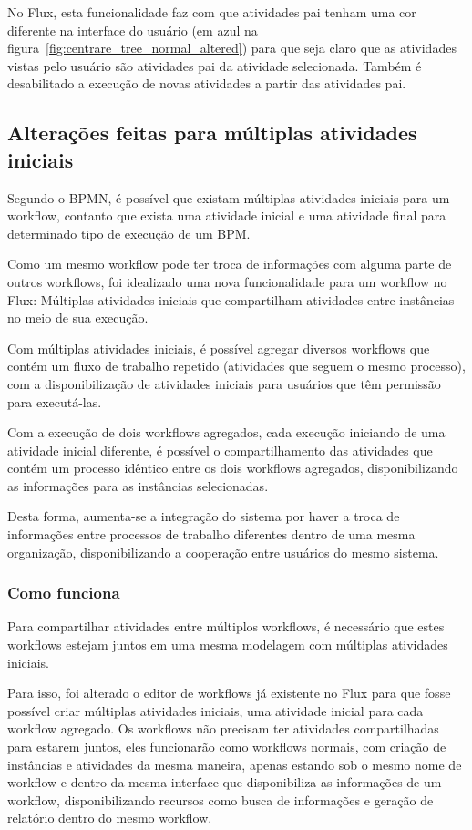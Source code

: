 No Flux, esta funcionalidade faz com que atividades pai tenham uma cor diferente na interface do usuário (em azul na figura~\ref{fig:centrare_tree_normal_altered}) para que seja claro que as atividades vistas pelo usuário são atividades pai da atividade selecionada. Também é desabilitado a execução de novas atividades a partir das atividades pai.

\subsection{Alterações feitas para múltiplas atividades iniciais}

Segundo o BPMN, é possível que existam múltiplas atividades iniciais para um workflow, contanto que exista uma atividade inicial e uma atividade final para determinado tipo de execução de um BPM.

Como um mesmo workflow pode ter troca de informações com alguma parte de outros workflows, foi idealizado uma nova funcionalidade para um workflow no Flux: Múltiplas atividades iniciais que compartilham atividades entre instâncias no meio de sua execução.

Com múltiplas atividades iniciais, é possível agregar diversos workflows que contém um fluxo de trabalho repetido (atividades que seguem o mesmo processo), com a disponibilização de atividades iniciais para usuários que têm permissão para executá-las.

Com a execução de dois workflows agregados, cada execução iniciando de uma atividade inicial diferente, é possível o compartilhamento das atividades que contém um processo idêntico entre os dois workflows agregados, disponibilizando as informações para as instâncias selecionadas.

Desta forma, aumenta-se a integração do sistema por haver a troca de informações entre processos de trabalho diferentes dentro de uma mesma organização, disponibilizando a cooperação entre usuários do mesmo sistema.

\subsubsection{Como funciona}

Para compartilhar atividades entre múltiplos workflows, é necessário que estes workflows estejam juntos em uma mesma modelagem com múltiplas atividades iniciais.

Para isso, foi alterado o editor de workflows já existente no Flux para que fosse possível criar múltiplas atividades iniciais, uma atividade inicial para cada workflow agregado.
Os workflows não precisam ter atividades compartilhadas para estarem juntos, eles funcionarão como workflows normais, com criação de instâncias e atividades da mesma maneira, apenas estando sob o mesmo nome de workflow e dentro da mesma interface que disponibiliza as informações de um workflow, disponibilizando recursos como busca de informações e geração de relatório dentro do mesmo workflow.


